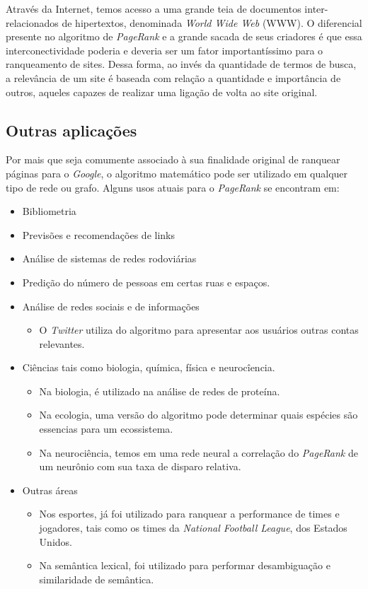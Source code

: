 \documentclass[11pt]{article}
\begin{document}
Através da Internet, temos acesso a uma grande teia de documentos
inter-relacionados de hipertextos, denominada \emph{World Wide Web}
(WWW). O diferencial presente no algoritmo de \emph{PageRank} e a grande
sacada de seus criadores é que essa interconectividade poderia e deveria
ser um fator importantíssimo para o ranqueamento de sites. Dessa forma,
ao invés da quantidade de termos de busca, a relevância de um site é
baseada com relação a quantidade e importância de outros, aqueles
capazes de realizar uma ligação de volta ao site original.

    \hypertarget{outras-aplicauxe7uxf5es}{%
\subsection{Outras aplicações}\label{outras-aplicauxe7uxf5es}}

Por mais que seja comumente associado à sua finalidade original de
ranquear páginas para o \emph{Google}, o algoritmo matemático pode ser
utilizado em qualquer tipo de rede ou grafo. Alguns usos atuais para o
\emph{PageRank} se encontram em:

\begin{itemize}
\item Bibliometria
\item Previsões e recomendações de links
\item Análise de sistemas de redes rodoviárias
\item Predição do número de pessoas em certas ruas e espaços.
\item Análise de redes sociais e de informações
\begin{itemize}
\item O \emph{Twitter} utiliza do algoritmo para apresentar aos usuários outras contas relevantes.
\end{itemize}
\item Ciências tais como biologia, química, física e neurocîencia.
\begin{itemize}
\item Na biologia, é utilizado na análise de redes de proteína.
\item Na ecologia, uma versão do algoritmo pode determinar quais espécies são essencias para um ecossistema.
\item Na neurociência, temos em uma rede neural a correlação do
\emph{PageRank} de um neurônio com sua taxa de disparo relativa.
\end{itemize}
\item Outras áreas
\begin{itemize}
\item Nos esportes, já foi utilizado para ranquear a
performance de times e jogadores, tais como os times da \emph{National
Football League}, dos Estados Unidos.
\item Na semântica lexical, foi
utilizado para performar desambiguação e similaridade de semântica.
\end{itemize}
\end{itemize}
\end{document}
